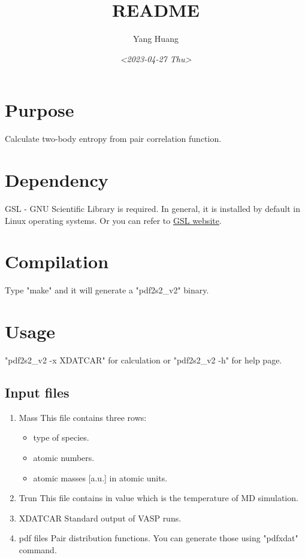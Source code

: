 \documentclass[11pt]{article}
\author{Yang Huang}
\date{\textit{<2023-04-27 Thu>}}
\title{README}
\begin{document}
\maketitle
\tableofcontents


\section{Purpose}
\label{sec:org0717de3}
Calculate two-body entropy from pair correlation function.

\section{Dependency}
\label{sec:orgce73abd}
GSL - GNU Scientific Library is required. In general, it is installed
by default in Linux operating systems. Or you can refer to \href{https://www.gnu.org/software/gsl/}{GSL
website}.

\section{Compilation}
\label{sec:org5f823e5}
Type "make" and it will generate a "pdf2s2\_v2" binary.

\section{Usage}
\label{sec:org414e2c1}
"pdf2s2\_v2 -x XDATCAR" for calculation or "pdf2s2\_v2 -h" for help page.

\subsection{Input files}
\label{sec:orga23d22c}
\begin{enumerate}
\item Mass
This file contains three rows:
\begin{itemize}
\item type of species.
\item atomic numbers.
\item atomic masses [a.u.] in atomic units.
\end{itemize}

\item Trun
This file contains in value which is the temperature of MD simulation.

\item XDATCAR
Standard output of VASP runs.

\item pdf files
Pair distribution functions. You can generate those using "pdfxdat"
command.
\end{enumerate}
\end{document}
